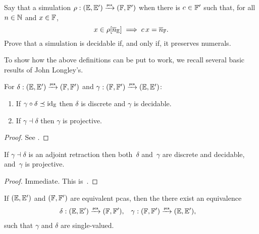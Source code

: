 \begin{exercise}
  \label{exc:simulation-numerals}%
  Say that a simulation $\rho: (\EE, \subEE) \pcato (\FF, \subFF)$ 
  when there is $c \in \subFF$ such that, for all $n \in \NN$ and $x \in \FF$,
  \begin{equation*}
    x \in \rho[\overline{n}_\EE] \implies c \, x = \overline{n}_\FF.
  \end{equation*}
  Prove that a simulation is decidable if, and only if, it preserves numerals.
\end{exercise}


To show how the above definitions can be put to work, we recall several basic results of John Longley's.

\begin{theorem}
  \label{th:simulation-properties2}%
  For $\delta: (\EE, \subEE) \pcato (\FF, \subFF)$ and
  $\gamma: (\FF, \subFF) \pcato (\EE, \subEE)$:
  \begin{enumerate}
  \item
    If $\gamma \circ \delta \preceq \id[\EE]$ then $\delta$ is discrete 
    and $\gamma$ is decidable.
  \item
    If $\gamma \dashv \delta$ then $\gamma$ is projective.
  \end{enumerate}
\end{theorem}

\begin{proof}
  See \cite[Theorem 2.5.3]{Longley:94}.
\end{proof}

\begin{corollary}
  \label{th:simulation-properties}%
  If $\gamma \dashv \delta$ is an adjoint retraction then both~$\delta$
  and~$\gamma$ are discrete and decidable, and~$\gamma$ is projective.
\end{corollary}

\begin{proof}
  Immediate. This is~\cite[Corollary 2.5.4]{Longley:94}.
\end{proof}

\begin{corollary}
  \label{th:simulation-properties-more}%
  If $(\EE, \subEE)$ and $(\FF, \subFF)$ are equivalent pcas, then the 
  there exist an equivalence
  \begin{align*}
    \delta &: (\EE, \subEE) \pcato (\FF, \subFF),
    &
    \gamma &: (\FF, \subFF) \pcato (\EE, \subEE),
  \end{align*}
  such that $\gamma$ and $\delta$ are single-valued.
\end{corollary}

